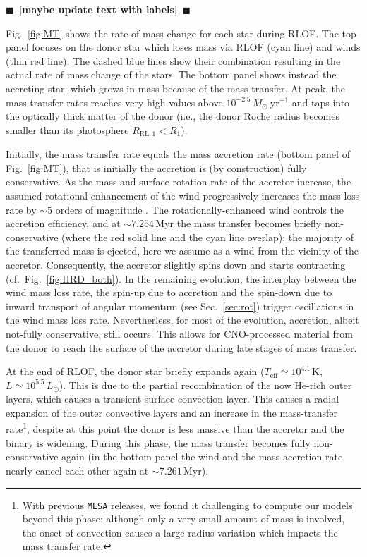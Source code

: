 \documentclass[twocolumn,twocolappendix,trackchanges]{aastex63}
\DeclareRobustCommand{\Figref}[1]{Fig.~\ref{#1}}
\DeclareRobustCommand{\Secref}[1]{Sec.~\ref{#1}}
\newcommand{\todo}[1]{{\large $\blacksquare$~\textbf{\color{red}[#1]}}~$\blacksquare$}
\begin{document}
\todo{maybe update text with labels}

\Figref{fig:MT} shows the rate of mass change for each star during
RLOF. The top panel focuses on the donor star which loses mass via RLOF
(cyan line) and winds (thin red line). The dashed blue lines
show their combination resulting in the actual rate of mass change of
the stars. The bottom panel shows instead the accreting star, which
grows in mass because of the mass transfer. At peak, the mass transfer
rates reaches very high values above
$10^{-2.5}\,M_\odot\ \mathrm{yr^{-1}}$ and taps into the optically
thick matter of the donor (i.e., the donor Roche radius becomes
smaller than its photosphere $R_\mathrm{RL,1}<R_1$).


Initially, the mass transfer rate equals the mass accretion rate
(bottom panel of \Figref{fig:MT}), that is initially the accretion is
(by construction) fully conservative. As the mass and surface rotation
rate of the accretor increase, the assumed rotational-enhancement of
the wind progressively increases the mass-loss rate by $\sim$5 orders
of magnitude \citep{langer:98}. The rotationally-enhanced wind
controls the accretion efficiency, and at
$\sim$$7.254$\,Myr the mass transfer becomes briefly non-conservative (where the red solid line and the cyan line overlap): the majority of the transferred mass is ejected, here we assume as a wind from the vicinity of the accretor. Consequently, the accretor slightly spins down and starts contracting (cf.~\Figref{fig:HRD_both}). In the remaining evolution, the interplay between the wind mass loss rate, the spin-up due to accretion and the spin-down due to inward transport of angular momentum (see \Secref{sec:rot}) trigger oscillations in the wind mass loss rate. Nevertherless, for most of the evolution, accretion, albeit not-fully conservative, still occurs. This allows for CNO-processed material from the donor to reach the surface of the accretor during late stages of mass transfer.


At the end of RLOF, the donor star briefly expands again
($T_\mathrm{eff}\simeq10^{4.1}$\,K, $L\simeq10^{5.5}\,L_\odot$). This
is due to the partial recombination of the now He-rich outer layers,
which causes a transient surface convection layer. This causes a
radial expansion of the outer convective layers and an increase in the
mass-transfer rate\footnote{With previous \texttt{MESA} releases, we found it challenging to compute our models beyond this phase: although only a very small amount of mass is
involved, the onset of convection causes a large radius variation
which impacts the mass transfer rate.}, despite at this point the donor is less massive
than the accretor and the binary is widening.  During this phase, the
mass transfer becomes fully non-conservative again (in the bottom
panel the wind and the mass accretion rate nearly cancel each other again
at $\sim7.261$\,Myr).
\end{document}
